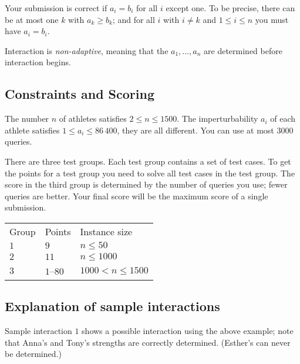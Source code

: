 Your submission is correct if $a_i=b_i$ for all $i$ except one.
To be precise, there can be at most one $k$ with $a_k\geq b_k$;
and for all $i$ with $i\neq k$ and $1\leq i\leq n$ you must have $a_i=b_i$.

Interaction is \emph{non-adaptive}, meaning that the $a_1,\ldots, a_n$ are determined before interaction begins.

\subsection*{Constraints and Scoring}

The number $n$ of athletes satisfies 
$2\leq n\leq 1500$. %
The imperturbability $a_i$ of each athlete satisfies 
$1\leq a_i\leq 86\,400$, %
they are all different. %
You can use 
at most $3000$ queries. %

There are three test groups.
Each test group contains a set of test cases. 
To get the points for a test group you need to solve all test cases in the test group.
The score in the third group is determined by the number of queries you use;
fewer queries are better.
Your final score will be the maximum score of a single submission.

\medskip
\begin{tabular}{lll}
Group & Points & Instance size\\
$1$  &  $9$ & $n\leq 50$\\
$2$  &  $11$ & $n\leq 1000$\\
$3$  &  $1$--$80$ & $1000 < n\leq 1500$\\
\end{tabular}

\subsection*{Explanation of sample interactions}


Sample interaction $1$ shows a possible interaction using the above example; note that Anna's and Tony's strengths are correctly determined.
(Esther's can never be determined.)
